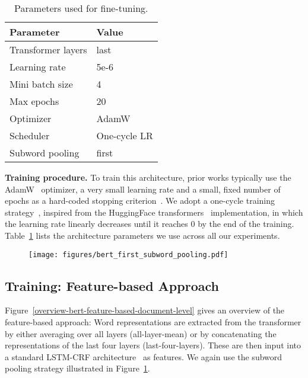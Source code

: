 \documentclass[11pt,a4paper]{article}
\begin{document}
\begin{table}[h]
\begin{center}
\begin{tabular}{ l l }
\toprule
Parameter & Value \\
\midrule
Transformer layers & last \\
Learning rate & 5e-6 \\
Mini batch size & 4 \\
Max epochs & 20 \\
Optimizer & AdamW \\ Scheduler & One-cycle LR \\
Subword pooling & first \\
\bottomrule
\end{tabular}
\end{center}
\vspace{-2mm}
\caption{\label{tab:finetuning_params} Parameters used for fine-tuning.}
\end{table}


\noindent 
\textbf{Training procedure.} 
To train this architecture, prior works typically use the AdamW~\cite{loshchilov2018decoupled} optimizer, a very small learning rate and a small, fixed number of epochs as a hard-coded stopping criterion~\cite{conneau2019unsupervised}. We adopt a one-cycle training strategy~\cite{2018arXiv180309820S}, inspired from the HuggingFace transformers~\cite{wolf2019huggingface} implementation, in which the learning rate linearly decreases until it reaches $0$ by the end of the training. Table~\ref{tab:finetuning_params} lists the architecture parameters we use across all our experiments. 


\begin{figure}[t!]
 \centering
 \texttt{[image: figures/bert\_first\_subword\_pooling.pdf]}
 \label{fig:subword_pooling}
\end{figure}


\subsection{Training: Feature-based Approach}

Figure~\ref{overview-bert-feature-based-document-level} gives an overview of the feature-based approach: Word representations are extracted from the transformer by either averaging over all layers (all-layer-mean) or by concatenating the representations of the last four layers (last-four-layers). These are then input into a standard LSTM-CRF architecture~\cite{2015arXiv150801991H} as features. We again use the subword pooling strategy illustrated in Figure~\ref{fig:subword_pooling}. 
\end{document}
